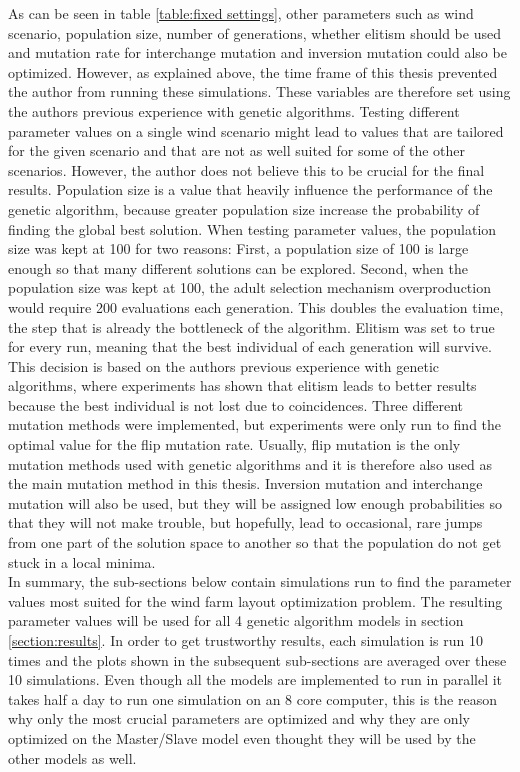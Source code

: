 \noindent As can be seen in table \ref{table:fixed settings}, other parameters such as wind scenario, population size, number of generations, whether elitism should be used and mutation rate for interchange mutation and inversion mutation could also be optimized. However, as explained above, the time frame of this thesis prevented the author from running these simulations. These variables are therefore set using the authors previous experience with genetic algorithms. Testing different parameter values on a single wind scenario might lead to values that are tailored for the given scenario and that are not as well suited for some of the other scenarios. However, the author does not believe this to be crucial for the final results. Population size is a value that heavily influence the performance of the genetic algorithm, because greater population size increase the probability of finding the global best solution. When testing parameter values, the population size was kept at 100 for two reasons: First, a population size of 100 is large enough so that many different solutions can be explored. Second, when the population size was kept at 100, the adult selection mechanism overproduction would require 200 evaluations each generation. This doubles the evaluation time, the step that is already the bottleneck of the algorithm. Elitism was set to true for every run, meaning that the best individual of each generation will survive. This decision is based on the authors previous experience with genetic algorithms, where experiments has shown that elitism leads to better results because the best individual is not lost due to coincidences. Three different mutation methods were implemented, but experiments were only run to find the optimal value for the flip mutation rate. Usually, flip mutation is the only mutation methods used with genetic algorithms and it is therefore also used as the main mutation method in this thesis. Inversion mutation and interchange mutation will also be used, but they will be assigned low enough probabilities so that they will not make trouble, but hopefully, lead to occasional, rare jumps from one part of the solution space to another so that the population do not get stuck in a local minima.\\

\noindent In summary, the sub-sections below contain simulations run to find the parameter values most suited for the wind farm layout optimization problem. The resulting parameter values will be used for all 4 genetic algorithm models in section \ref{section:results}. In order to get trustworthy results, each simulation is run 10 times and the plots shown in the subsequent sub-sections are averaged over these 10 simulations. Even though all the models are implemented to run in parallel it takes half a day to run one simulation on an 8 core computer, this is the reason why only the most crucial parameters are optimized and why they are only optimized on the Master/Slave model even thought they will be used by the other models as well.\\

